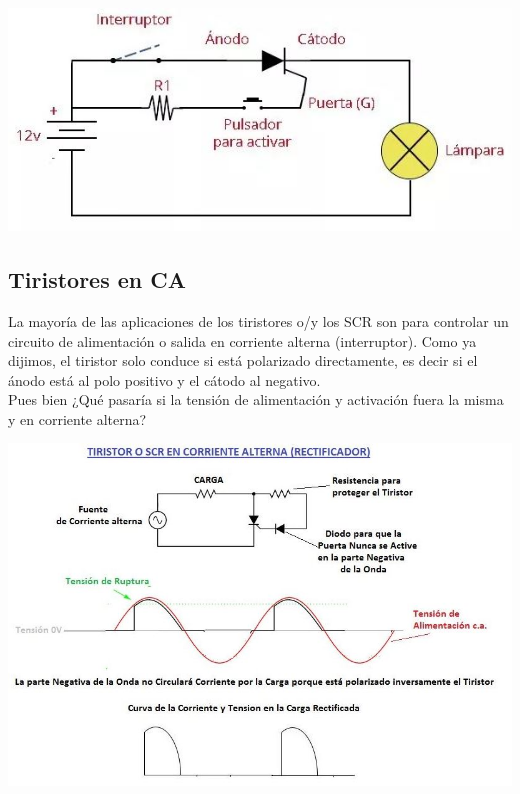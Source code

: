 \documentclass[12pt,a4paper]{article}
\begin{document}
\begin{center}
\includegraphics[scale=0.8]{imagenes/tiristor2.JPG} 
\end{center}
\newpage
\begin{center}
\section {Tiristores en CA}
\end{center}
La mayoría de las aplicaciones de los tiristores o/y los SCR son para controlar un circuito de alimentación o salida en corriente alterna (interruptor). Como ya dijimos, el tiristor solo conduce si está polarizado directamente, es decir si el ánodo está al polo positivo y el cátodo al negativo.\\ Pues bien ¿Qué pasaría si la tensión de alimentación y activación fuera la misma y en corriente alterna? \\
\begin{center}
\includegraphics[scale=0.8]{imagenes/tiristorCA.JPG} 
\end{center}
\end{document}
